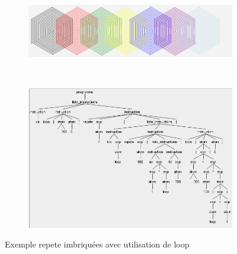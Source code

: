 \documentclass[a4paper,11pt]{article}
\begin{document}
\begin{figure}[!h]
	\centering
	\begin{subfigure}[t]{.5\textwidth}
		\includegraphics[width=\textwidth]{img/loop_figure}
	\end{subfigure}
	~
	\begin{subfigure}[t]{0.7\textwidth}
		\includegraphics[width=\textwidth]{img/loop_tree}
	\end{subfigure}
	\caption{Exemple repete imbriquées avec utilisation de loop}
\end{figure}
\end{document}
